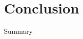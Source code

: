 \section{Conclusion}

\begin{frame}{Summary}
    \pause 
    

\end{frame}


\begin{frame}
	\renewcommand{\insertsectionnumber}{!}
	\renewcommand{\insertsection}{End of Talk}
	\sectionpage
\end{frame}